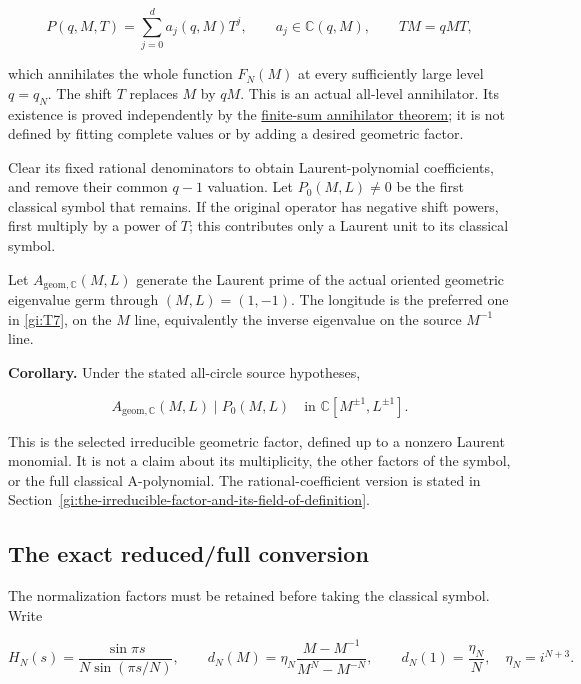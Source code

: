 \begin{equation}\label{gi:O2}
P(q,M,T)=\sum_{j=0}^{d}a_j(q,M)T^j,\qquad
 a_j\in\mathbb C(q,M),\qquad TM=qMT,
\end{equation}

which annihilates the whole function \(F_N(M)\) at every sufficiently
large level \(q=q_N\). The shift \(T\) replaces \(M\) by \(qM\).
This is an actual all-level annihilator. Its existence is proved
independently by the
\href{https://sashakolpakov.github.io/murakamis_dream/notes/finite_sum_annihilator.html}{finite-sum annihilator theorem};
it is not defined by fitting complete values or by adding a desired
geometric factor.

Clear its fixed rational denominators to obtain Laurent-polynomial
coefficients, and remove their common \(q-1\) valuation. Let
\(P_0(M,L)\ne0\) be the first classical symbol that remains. If the
original operator has negative shift powers, first multiply by a
power of \(T\); this contributes only a Laurent unit to its
classical symbol.

Let \(A_{\mathrm{geom},\mathbb C}(M,L)\) generate the Laurent
prime of the actual oriented geometric eigenvalue germ through
\((M,L)=(1,-1)\). The longitude is the preferred one in \eqref{gi:T7},
on the \(M\) line, equivalently the inverse eigenvalue on the
source \(M^{-1}\) line.

\textbf{Corollary.} Under the stated all-circle source hypotheses,

\begin{equation}\label{gi:O3}
A_{\mathrm{geom},\mathbb C}(M,L)\mid P_0(M,L)
       \quad\text{in }\mathbb C[M^{\pm1},L^{\pm1}].
\end{equation}

This is the selected irreducible geometric factor, defined up to a
nonzero Laurent monomial. It is not a claim about its multiplicity,
the other factors of the symbol, or the full classical A-polynomial.
The rational-coefficient version is stated in Section~\ref{gi:the-irreducible-factor-and-its-field-of-definition}.

\subsection{The exact reduced/full conversion}\label{gi:the-exact-reducedfull-conversion}

The normalization factors must be retained before taking the
classical symbol. Write

\begin{equation}\label{gi:O4}
H_N(s)=\frac{\sin\pi s}{N\sin(\pi s/N)},\qquad
 d_N(M)=\eta_N\frac{M-M^{-1}}{M^N-M^{-N}},\qquad
 d_N(1)=\frac{\eta_N}{N},\quad \eta_N=i^{N+3}.
\end{equation}

